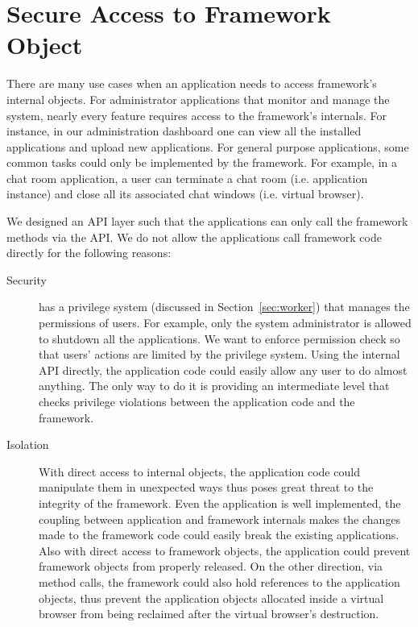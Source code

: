 \section{Secure Access to Framework Object}
\label{sec:api}


There are many use cases when an application needs to access framework's
internal objects. For administrator applications that monitor and manage the
system, nearly every feature requires access to the framework's internals. For
instance, in our administration dashboard one can view all the installed
applications and upload new applications. For general purpose applications,
some common tasks could only be implemented by the framework. For example, in
a chat room application, a user can terminate a chat room (i.e. application
instance) and close all its associated chat windows (i.e. virtual browser).

We designed an API layer such that the applications can only call the
framework methods via the API. We do not allow the applications call framework
code directly for the following reasons:

\begin{description}

\item[Security] \cb has a privilege system (discussed in
Section~\ref{sec:worker})  that manages the permissions of users. For example,
only the system administrator is allowed to shutdown all the  applications. We
want to enforce permission check so that users' actions  are limited by the
privilege system. Using the internal API directly, the application code could
easily allow any user to do almost anything. The only way to do it is
providing an intermediate level  that checks privilege violations between the
application code and the framework.

\item[Isolation] With direct access to internal objects, the application  code
could manipulate them in unexpected ways thus poses great threat to  the
integrity of the framework. Even the application is well implemented, the
coupling between application and framework internals makes the changes made to
the framework code could easily break the existing applications. Also with
direct access to framework objects, the application could prevent framework
objects from properly released. On the other direction, via method calls, the
framework could also hold references to the application objects, thus prevent
the application objects allocated inside a virtual browser from being
reclaimed after the virtual browser's destruction. 

\end{description}


